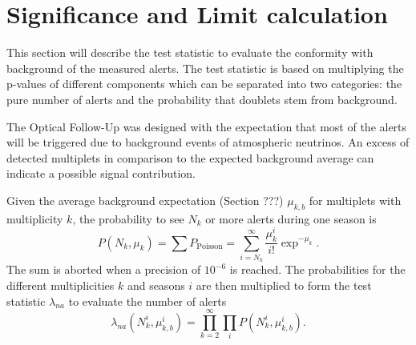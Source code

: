 \newpage
\section{Significance and Limit calculation}
\label{sec:limits}
This 
section will describe the test statistic to evaluate the conformity with 
background of the measured alerts.
The test statistic is based on multiplying the p-values of different 
components which can be separated into two categories: the pure number of 
alerts and the probability that doublets stem from background.

The Optical Follow-Up was designed with the expectation that most of the alerts 
will be triggered due to background events of atmospheric neutrinos. An excess 
of detected multiplets in comparison to the expected background 
average can indicate a possible signal contribution. 

Given the average 
background expectation (Section ???) $\mu_{k,b}$ for multiplets with 
multiplicity $k$, the probability to see $N_k$ or more alerts during one 
season is
\begin{equation}
 P(N_k, \mu_k) = \sum P_\text{Poisson} = \sum_{i=N_k}^\infty 
\frac{\mu_k^i}{i!}\exp^{-\mu_k}.
\end{equation}
The sum is aborted when a precision of $10^{-6}$ is reached.
The probabilities for the different multiplicities $k$ and seasons $i$ are then 
multiplied to form the test statistic $\lambda_{na}$ to evaluate the number of 
alerts
\begin{equation}
\label{eq:test_statistic}
 \lambda_{na} \left(N_k^i, \mu_{k,b}^i \right) = \prod_{k=2}^\infty \prod_i 
P(N_k^i, 
\mu_{k,b}^i).
\end{equation}

